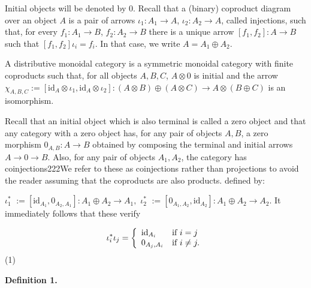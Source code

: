 \documentclass[10pt,a4paper]{amsart}
\begin{document}
 
 
Initial objects will be denoted by $0$. Recall that a (binary) coproduct diagram over an object $A$ is a pair of arrows $\iota_{1}:A_{1}\to A$, $\iota_{2}:A_{2}\to A$, called injections, such that, for every $f_{1}:A_{1}\to B$, $f_{2}:A_{2}\to B$ there is a unique arrow $[f_{1},f_{2}]:A\to B$ such that $[f_{1},f_{2}]\iota_{i}=f_{i}$. In that case, we write $A=A_{1}\oplus A_{2}$.\par
 
 
 
A distributive monoidal category is a symmetric monoidal category with finite coproducts such that, for all objects $A,B,C$, $A\otimes 0$ is initial and the arrow $\chi_{A,B,C}:=[\mathrm{id}_{A}\otimes\iota_{1},\mathrm{id}_{A}\otimes\iota_{2}%
]:(A\otimes B)\oplus(A\otimes C)\to A\otimes(B\oplus C)$ is an isomorphism.\par
 
 
 
Recall that an initial object which is also terminal is called a zero object and that any category with a zero object has, for any pair of objects $A,B$, a zero morphism $0_{A,B}:A\to B$ obtained by composing the terminal and initial arrows $A\to 0\to B$. Also, for any pair of objects $A_{1},A_{2}$, the category has coinjections222We refer to these as coinjections rather than projections to avoid the reader assuming that the coproducts are also products. defined by:\par
    $\displaystyle\iota_{1}^{\ast}$ $\displaystyle:=[\mathrm{id}_{A_{1}},0_{A_{2},A_{1}}]:A_{1}\oplus A_{2}\to A_{1},$ $\displaystyle\iota_{2}^{\ast}$ $\displaystyle:=[0_{A_{1},A_{2}},\mathrm{id}_{A_{2}}]:A_{1}\oplus A_{2}\to A_{2}.$    
It immediately follows that these verify\par
    \[\iota^{\ast}_{i}\iota_{j}=\left\{\begin{array}[]{ll}\mathrm{id}_{A_{i}}&\text{%
if }i=j\\
0_{A_{j},A_{i}}&\text{if }i\neq j.\end{array}\right.\]  (1)   
 
 
\par\medskip\noindent\textbf{Definition 1.}\par
 
\end{document}
